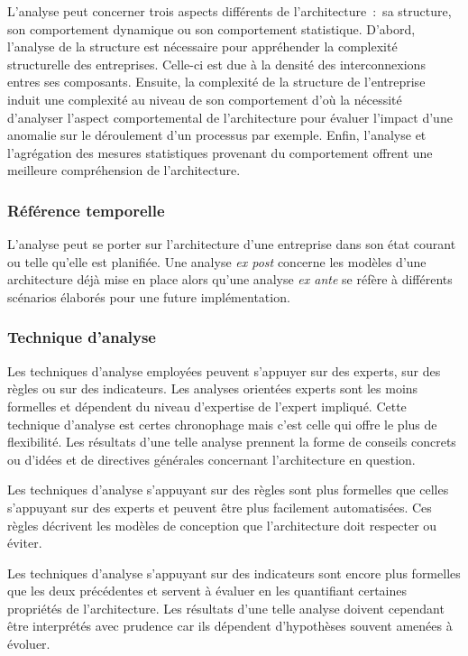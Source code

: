 L'analyse peut concerner trois aspects différents de l'architecture~:~sa
structure, son comportement dynamique ou son comportement statistique. D'abord,
l'analyse de la structure est nécessaire pour appréhender la complexité
structurelle des entreprises. Celle-ci est due à la densité des interconnexions
entres ses composants. Ensuite, la complexité de la structure de l'entreprise
induit une complexité au niveau de son comportement d'où la nécessité
d'analyser l'aspect comportemental de l'architecture pour évaluer l'impact
d'une anomalie sur le déroulement d'un processus par exemple. Enfin, l'analyse et
l'agrégation des mesures statistiques provenant du comportement offrent une
meilleure compréhension de l'architecture.

\subsubsection{Référence temporelle}

L'analyse peut se porter sur l'architecture d'une entreprise dans son état
courant ou telle qu'elle est planifiée. Une analyse \textit{ex post} concerne
les modèles d'une architecture déjà mise en place alors qu'une analyse
\textit{ex ante} se réfère à différents scénarios élaborés pour une future
implémentation.

\subsubsection{Technique d'analyse}

Les techniques d'analyse employées peuvent s'appuyer sur des experts, sur des
règles ou sur des indicateurs. Les analyses orientées experts sont les moins
formelles et dépendent du niveau d'expertise de l'expert impliqué. Cette technique d'analyse est certes chronophage mais c'est celle qui offre le plus de flexibilité. Les résultats d'une telle analyse prennent la forme de conseils
concrets ou d'idées et de directives générales concernant l'architecture en
question.

Les techniques d'analyse s'appuyant sur des règles sont plus formelles que
celles s'appuyant sur des experts et peuvent être plus facilement automatisées.
Ces règles décrivent les modèles de conception que l'architecture doit
respecter ou éviter. 

Les techniques d'analyse s'appuyant sur des indicateurs sont encore plus
formelles que les deux précédentes et servent à évaluer en les quantifiant
certaines propriétés de l'architecture. Les résultats d'une telle analyse
doivent cependant être interprétés avec prudence car ils dépendent d'hypothèses
souvent amenées à évoluer.


